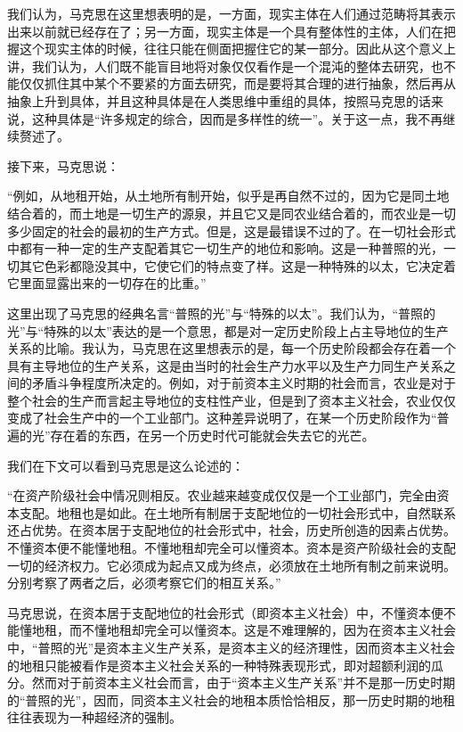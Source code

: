 \documentclass[a4paper,twoside,12pt,AutoFakeBold]{ctexart}
\begin{document}
我们认为，马克思在这里想表明的是，一方面，现实主体在人们通过范畴将其表示出来以前就已经存在了；另一方面，现实主体是一个具有整体性的主体，人们在把握这个现实主体的时候，往往只能在侧面把握住它的某一部分。因此从这个意义上讲，我们认为，人们既不能盲目地将对象仅仅看作是一个混沌的整体去研究，也不能仅仅抓住其中某个不要紧的方面去研究，而是要将其合理的进行抽象，然后再从抽象上升到具体，并且这种具体是在人类思维中重组的具体，按照马克思的话来说，这种具体是“许多规定的综合，因而是多样性的统一”。关于这一点，我不再继续赘述了。

接下来，马克思说：
\begin{adjustwidth}{2em}{2em}
    \qquad\fangsong
    “例如，从地租开始，从土地所有制开始，似乎是再自然不过的，因为它是同土地结合着的，而土地是一切生产的源泉，并且它又是同农业结合着的，而农业是一切多少固定的社会的最初的生产方式。但是，这是最错误不过的了。在一切社会形式中都有一种一定的生产支配着其它一切生产的地位和影响。这是一种普照的光，一切其它色彩都隐没其中，它使它们的特点变了样。这是一种特殊的以太，它决定着它里面显露出来的一切存在的比重。”
\end{adjustwidth}

这里出现了马克思的经典名言“普照的光”与“特殊的以太”。我们认为，“普照的光”与“特殊的以太”表达的是一个意思，都是对一定历史阶段上占主导地位的生产关系的比喻。我认为，马克思在这里想表示的是，每一个历史阶段都会存在着一个具有主导地位的生产关系，这是由当时的社会生产力水平以及生产力同生产关系之间的矛盾斗争程度所决定的。例如，对于前资本主义时期的社会而言，农业是对于整个社会的生产而言起主导地位的支柱性产业，但是到了资本主义社会，农业仅仅变成了社会生产中的一个工业部门。这种差异说明了，在某一个历史阶段作为“普遍的光”存在着的东西，在另一个历史时代可能就会失去它的光芒。

我们在下文可以看到马克思是这么论述的：
\begin{adjustwidth}{2em}{2em}
    \qquad\fangsong
    “在资产阶级社会中情况则相反。农业越来越变成仅仅是一个工业部门，完全由资本支配。地租也是如此。在土地所有制居于支配地位的一切社会形式中，自然联系还占优势。在资本居于支配地位的社会形式中，社会，历史所创造的因素占优势。不懂资本便不能懂地租。不懂地租却完全可以懂资本。资本是资产阶级社会的支配一切的经济权力。它必须成为起点又成为终点，必须放在土地所有制之前来说明。分别考察了两者之后，必须考察它们的相互关系。”
\end{adjustwidth}

马克思说，在资本居于支配地位的社会形式（即资本主义社会）中，不懂资本便不能懂地租，而不懂地租却完全可以懂资本。这是不难理解的，因为在资本主义社会中，“普照的光”是资本主义生产关系，是资本主义的经济理性，因而资本主义社会的地租只能被看作是资本主义社会关系的一种特殊表现形式，即对超额利润的瓜分。然而对于前资本主义社会而言，由于“资本主义生产关系”并不是那一历史时期的“普照的光”，因而，同资本主义社会的地租本质恰恰相反，那一历史时期的地租往往表现为一种超经济的强制。
\end{document}
